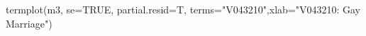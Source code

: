 \begin{Schunk}
\begin{Sinput}
 termplot(m3, se=TRUE, partial.resid=T, terms="V043210",xlab="V043210: Gay Marriage")
\end{Sinput}
\end{Schunk}

